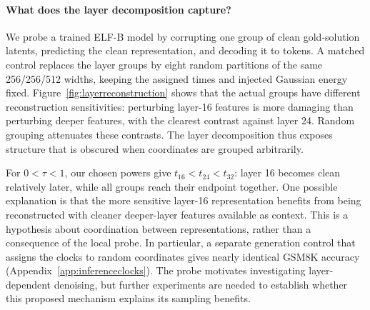\paragraph{What does the layer decomposition capture?}
We probe a trained ELF-B model by corrupting one group of clean gold-solution latents, predicting the clean representation, and decoding it to tokens. A matched control replaces the layer groups by eight random partitions of the same 256/256/512 widths, keeping the assigned times and injected Gaussian energy fixed. Figure~\ref{fig:layerreconstruction} shows that the actual groups have different reconstruction sensitivities: perturbing layer-16 features is more damaging than perturbing deeper features, with the clearest contrast against layer 24. Random grouping attenuates these contrasts. The layer decomposition thus exposes structure that is obscured when coordinates are grouped arbitrarily.



For $0<\tau<1$, our chosen powers give $t_{16}<t_{24}<t_{32}$: layer 16 becomes clean relatively later, while all groups reach their endpoint together. One possible explanation is that the more sensitive layer-16 representation benefits from being reconstructed with cleaner deeper-layer features available as context. This is a hypothesis about coordination between representations, rather than a consequence of the local probe. In particular, a separate generation control that assigns the clocks to random coordinates gives nearly identical GSM8K accuracy (Appendix~\ref{app:inferenceclocks}). The probe motivates investigating layer-dependent denoising, but further experiments are needed to establish whether this proposed mechanism explains its sampling benefits.
